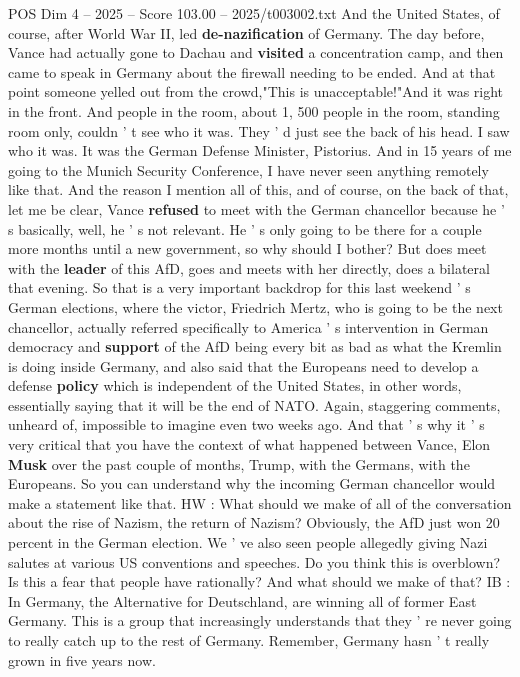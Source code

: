 \begin{textsample}{POS Dim 4 – 2025 – Score 103.00 – 2025/t003002.txt}
And the United States, of course, after World War II, led \textbf{de-nazification} of Germany.
The day before, Vance had actually gone to Dachau and \textbf{visited} a concentration camp, and then came to speak in Germany about the firewall needing to be ended.
And at that point someone yelled out from the crowd,"This is unacceptable!"And it was right in the front.
And people in the room, about 1, 500 people in the room, standing room only, couldn ' t see who it was.
They ' d just see the back of his head.
I saw who it was.
It was the German Defense Minister, Pistorius.
And in 15 years of me going to the Munich Security Conference, I have never seen anything remotely like that.
And the reason I mention all of this, and of course, on the back of that, let me be clear, Vance \textbf{refused} to meet with the German chancellor because he ' s basically, well, he ' s not relevant.
He ' s only going to be there for a couple more months until a new government, so why should I bother?
But does meet with the \textbf{leader} of this AfD, goes and meets with her directly, does a bilateral that evening.
So that is a very important backdrop for this last weekend ' s German elections, where the victor, Friedrich Mertz, who is going to be the next chancellor, actually referred specifically to America ' s intervention in German democracy and \textbf{support} of the AfD being every bit as bad as what the Kremlin is doing inside Germany, and also said that the Europeans need to develop a defense \textbf{policy} which is independent of the United States, in other words, essentially saying that it will be the end of NATO.
Again, staggering comments, unheard of, impossible to imagine even two weeks ago.
And that ' s why it ' s very critical that you have the context of what happened between Vance, Elon \textbf{Musk} over the past couple of months, Trump, with the Germans, with the Europeans.
So you can understand why the incoming German chancellor would make a statement like that.
HW : What should we make of all of the conversation about the rise of Nazism, the return of Nazism?
Obviously, the AfD just won 20 percent in the German election.
We ' ve also seen people allegedly giving Nazi salutes at various US conventions and speeches.
Do you think this is overblown?
Is this a fear that people have rationally?
And what should we make of that?
IB : In Germany, the Alternative for Deutschland, are winning all of former East Germany.
This is a group that increasingly understands that they ' re never going to really catch up to the rest of Germany.
Remember, Germany hasn ' t really grown in five years now.

\end{textsample}
